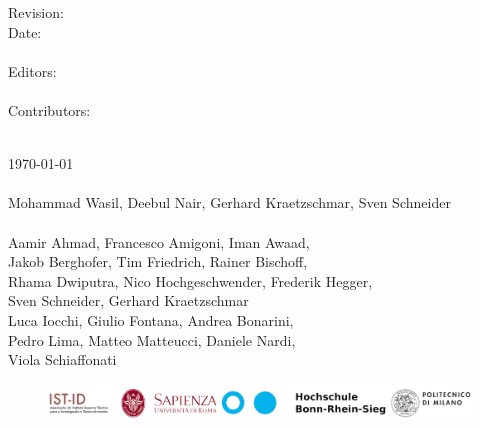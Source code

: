 \vfill
\noindent
\begin{minipage}[t]{0.18\textwidth}
\flushleft
	Revision:\\
	Date:\\
	\mbox{~}\\
	Editors:\\
	\mbox{~}\\
	Contributors:\\
\end{minipage}%
\hspace*{3mm}
\begin{minipage}[t]{0.8\textwidth}
\flushleft
	\revisionNumberRuleBook\\
	\today\\
	\mbox{~}\\
	Mohammad Wasil, Deebul Nair, Gerhard Kraetzschmar, Sven Schneider\\
	\mbox{~}\\
	Aamir Ahmad, Francesco Amigoni, Iman Awaad,\\ 
	Jakob Berghofer, Tim Friedrich, Rainer Bischoff,\\
	Rhama Dwiputra, Nico Hochgeschwender, Frederik Hegger,\\
	Sven Schneider, Gerhard Kraetzschmar \\
	Luca Iocchi, Giulio Fontana, Andrea Bonarini,\\
	Pedro Lima,	Matteo Matteucci, Daniele Nardi, \\
	Viola Schiaffonati
\end{minipage}
\hfill

\vfill
\vspace*{-10mm}
\begin{figure}[b]
	\centering
	\includegraphics[height=\institutionLogoHeight*2/5]{./fig/logos/ERL-CSR_logos.pdf}
\end{figure}

